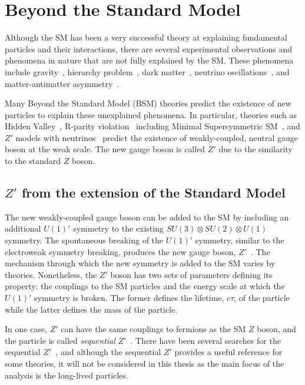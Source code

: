 \section{Beyond the Standard Model}
\label{sec:intro:bsm}

Although the SM has been a very successful theory at explaining fundamental particles and their interactions, there are several experimental observations and phenomena in nature that are not fully explained by the SM. These phenomena include gravity~\cite{PhysRevD.69.105009}, hierarchy problem~\cite{Magg:875284,Magg:133759}, dark matter~\cite{Alpigiani:2281629,bertone2005particle,clowe2006direct}, neutrino oscillations~\cite{ahn2003indications}, and matter-antimatter asymmetry~\cite{toussaint1979matter,dine2003origin}. 

Many Beyond the Standard Model (BSM) theories predict the existence of new particles to explain these unexplained phenomena. In particular, theories such as Hidden Valley~\cite{strassler2007echoes,cassel2010electroweak}, R-parity violation~\cite{senjanovic1975exact,mohapatra1981neutrino} including Minimal Supersymmetric SM~\cite{Barbier:2004ez}, and $Z'$ models with neutrinos~\cite{Basso:2008iv} predict the existence of weakly-coupled, neutral gauge boson at the weak scale. The new gauge boson is called $Z'$ due to the similarity to the standard $Z$ boson. 

\subsection{\texorpdfstring{$Z'$}{Z'} from the extension of the Standard Model}
\label{sec:intro:zprime_extension}

The new weakly-coupled gauge boson can be added to the SM by including an additional $U(1)'$ symmetry to the existing $SU(3) \otimes SU(2) \otimes U(1)$ symmetry. The spontaneous breaking of the $U(1)'$ symmetry, similar to the electroweak symmetry breaking, produces the new gauge boson, $Z'$~\cite{Langacker:2008yv}. The mechanism through which the new symmetry is added to the SM varies by theories. Nonetheless, the $Z'$ boson has two sets of parameters defining its property: the couplings to the SM particles and the energy scale at which the $U(1)'$ symmetry is broken. The former defines the lifetime, $c\tau$, of the particle while the latter defines the mass of the particle.

In one case, $Z'$ can have the same couplings to fermions as the SM $Z$ boson, and the particle is called \textit{sequential} $Z'$~\cite{BARGER1980377}. There have been several searches for the sequential $Z'$~\cite{PhysRevD.86.095010,ABAZOV201188,PhysRevD.90.052005}, and although the sequential $Z'$ provides a useful reference for some theories, it will not be considered in this thesis as the main focus of the analysis is the long-lived particles.


